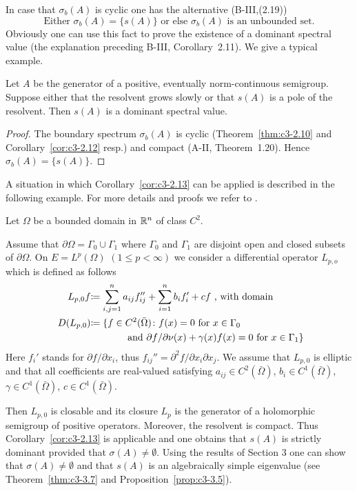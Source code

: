In case that $\sigma_{b}(A)$ is cyclic one has the alternative (\cf B-III,\;(2.19))
\[
\text{Either $\sigma_{b}(A) = \{s(A)\}$ or else $\sigma_{b}(A)$ is an unbounded set.}
\]
Obviously one can use this fact to prove the existence of a dominant spectral value (\cf the explanation preceding B-III, Corollary~2.11).
We give a typical example.
\begin{corollary}\label{cor:c3-2.13}
	Let $A$ be the generator of a positive, eventually norm-continuous semigroup.
	Suppose either that the resolvent grows slowly or that $s(A)$ is a pole of the resolvent.
	Then $s(A)$ is a dominant spectral value.
\end{corollary}
\begin{proof}
The boundary spectrum $\sigma_{b}(A)$ is cyclic (Theorem~\ref{thm:c3-2.10} and Corollary~\ref{cor:c3-2.12} resp.) and compact (A-II, Theorem~1.20).
Hence $\sigma_{b}(A) = \{s(A)\}$.
\end{proof}
A situation in which Corollary~\ref{cor:c3-2.13} can be applied is described in the following example.
For more details and proofs we refer to \citet{amann:1983}.
\begin{example}\label{ex:c3-2.14}
	Let $\Omega$ be a bounded domain in $\mathbb{R} ^{n}$ of class $C^{2}$.
	
	Assume that $\partial\Omega = \Gamma_{0}\cup\Gamma_{1}$ where $\Gamma_{0}$ and $\Gamma_{1}$ are disjoint open and closed subsets of $\partial\Omega$.
    On $E = L^{p}(\Omega)$ $(1 \leq p < \infty)$ we consider a differential operator $L_{p,o}$ which is defined as follows
\begin{equation}\label{eq:c3-2.23}
	\begin{aligned}
\text{$L_{p,0}f$} &\text{$\coloneqq \sum_{i,j=1}^{n} a_{ij} f_{ij}'' + \sum_{i=1}^{n} b_{i} f_{i}' + cf$ , with domain} \\
\text{ $D(L_{p,0})$} & \text{$\coloneqq \{f \in C^{2}(\bar{\Omega}) \colon$} 
\text{$ f(x) = 0$ for $x \in \Gamma_{0}$}\\ 
& \text{\phantom{aaaaaaa} and $\partial f/\partial\nu (x) + \gamma(x)f(x) = 0$ for $x \in \Gamma_{1}\}$}
	\end{aligned}
\end{equation}
Here $f_{i}'$ stands for $\partial f/\partial x_{i}$, thus $f_{ij}'' = \partial^{2}f/\partial x_{i}\partial x_{j}$.
We assume that $L_{p,0}$ is elliptic and that all coefficients are real-valued satisfying $a_{ij} \in C^{2}(\bar{\Omega})$, $b_{i} \in C^{1}(\bar{\Omega})$, $\gamma \in C^{1}(\bar{\Omega})$, $c \in C^{1}(\bar{\Omega})$.

Then $L_{p,0}$ is closable and its closure $L_{p}$ is the generator of a holomorphic semigroup of positive operators.
Moreover, the resolvent is compact.
Thus Corollary~\ref{cor:c3-2.13} is applicable and one obtains that $s(A)$ is strictly dominant provided that $\sigma(A) \neq \emptyset$.
Using the results of Section 3 one can show that $\sigma(A) \neq \emptyset$ and that $s(A)$ is an algebraically simple eigenvalue (see Theorem~\ref{thm:c3-3.7} and Proposition~\ref{prop:c3-3.5}).
\end{example}
